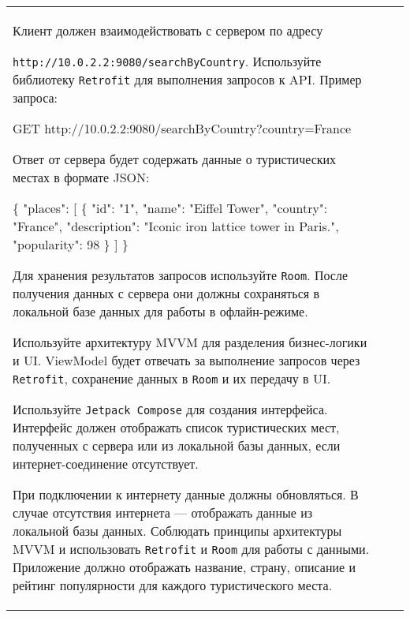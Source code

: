 \documentclass[a4paper]{article}
\begin{document}
\begin{tabular}{!{\vrule width 2pt}p{5cm}|p{6cm}|p{4cm}!{\vrule width 2pt}}
{\begin{minipage}{16cm}
\begin{enumerate}

Клиент должен взаимодействовать с сервером по адресу 

\texttt{http://10.0.2.2:9080/searchByCountry}. Используйте библиотеку \texttt{Retrofit} для выполнения запросов к API. Пример запроса:

 GET http://10.0.2.2:9080/searchByCountry?country=France 

Ответ от сервера будет содержать данные о туристических местах в формате JSON:

 \{ "places": [ \{ "id": "1", "name": "Eiffel Tower", 
    "country": "France", 
    "description": "Iconic iron lattice tower in Paris.", 
    "popularity": 98 \} ] \} 


Для хранения результатов запросов используйте \texttt{Room}. После получения данных с сервера они должны сохраняться в локальной базе данных для работы в офлайн-режиме.


Используйте архитектуру MVVM для разделения бизнес-логики и UI. ViewModel будет отвечать за выполнение запросов через \texttt{Retrofit}, сохранение данных в \texttt{Room} и их передачу в UI.


Используйте \texttt{Jetpack Compose} для создания интерфейса. Интерфейс должен отображать список туристических мест, полученных с сервера или из локальной базы данных, если интернет-соединение отсутствует.


При подключении к интернету данные должны обновляться.
В случае отсутствия интернета — отображать данные из локальной базы данных.
Соблюдать принципы архитектуры MVVM и использовать \texttt{Retrofit} и \texttt{Room} для работы с данными.
Приложение должно отображать название, страну, описание и рейтинг популярности для каждого туристического места. 
\end{enumerate}


\end{minipage}}
\end{tabular}
\end{document}
